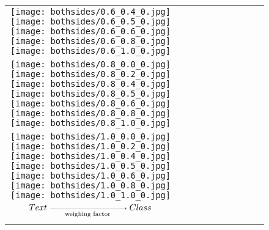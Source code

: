 \documentclass[10pt,twocolumn,letterpaper]{article}
\begin{document}
\begin{figure}[tb!]
{\begin{tabular}{c c c c c c c c c c}
  \texttt{[image: bothsides/0.6\_0.4\_0.jpg]}
  \texttt{[image: bothsides/0.6\_0.5\_0.jpg]}
  \texttt{[image: bothsides/0.6\_0.6\_0.jpg]}
  \texttt{[image: bothsides/0.6\_0.8\_0.jpg]}
  \texttt{[image: bothsides/0.6\_1.0\_0.jpg]}
\tabularnewline
    \raisebox{0.1in}{\rotatebox{90}{\small \emph{$0.8$}
 }}
  \texttt{[image: bothsides/0.8\_0.0\_0.jpg]}
  \texttt{[image: bothsides/0.8\_0.2\_0.jpg]}
   \texttt{[image: bothsides/0.8\_0.4\_0.jpg]}
  \texttt{[image: bothsides/0.8\_0.5\_0.jpg]}
  \texttt{[image: bothsides/0.8\_0.6\_0.jpg]}
  \texttt{[image: bothsides/0.8\_0.8\_0.jpg]}
  \texttt{[image: bothsides/0.8\_1.0\_0.jpg]}
\tabularnewline
    \raisebox{0.1in}{\rotatebox{90}{\small \emph{$1.0$}
 }}
  \texttt{[image: bothsides/1.0\_0.0\_0.jpg]}
  \texttt{[image: bothsides/1.0\_0.2\_0.jpg]}
   \texttt{[image: bothsides/1.0\_0.4\_0.jpg]}
  \texttt{[image: bothsides/1.0\_0.5\_0.jpg]}
  \texttt{[image: bothsides/1.0\_0.6\_0.jpg]}
  \texttt{[image: bothsides/1.0\_0.8\_0.jpg]}
  \texttt{[image: bothsides/1.0\_1.0\_0.jpg]}
    \tabularnewline
        \raisebox{0.1in}{\rotatebox{90}{
 }}
 \hspace{0.5mm}
$\scriptsize{Text}\xrightarrow[\text{weighing factor}]{\hspace*{3cm}}\scriptsize{Class}$
  \tabularnewline
\vspace{2mm}
\vspace{-2\baselineskip}
\end{tabular}}
\vspace{-0.8cm}
\hspace{20pt}
\label{fig:glideablation1}
\vspace{-2mm}
\end{figure} 
\end{document}
